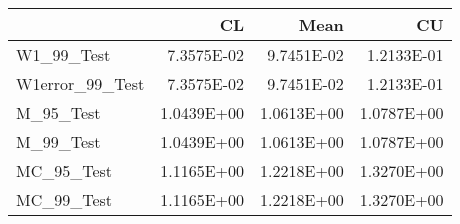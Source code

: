 \begin{tabular}{lrrr}
\toprule
{} &         CL &       Mean &         CU \\
\midrule
W1\_99\_Test      & 7.3575E-02 & 9.7451E-02 & 1.2133E-01 \\
W1error\_99\_Test & 7.3575E-02 & 9.7451E-02 & 1.2133E-01 \\
M\_95\_Test       & 1.0439E+00 & 1.0613E+00 & 1.0787E+00 \\
M\_99\_Test       & 1.0439E+00 & 1.0613E+00 & 1.0787E+00 \\
MC\_95\_Test      & 1.1165E+00 & 1.2218E+00 & 1.3270E+00 \\
MC\_99\_Test      & 1.1165E+00 & 1.2218E+00 & 1.3270E+00 \\
\bottomrule
\end{tabular}

